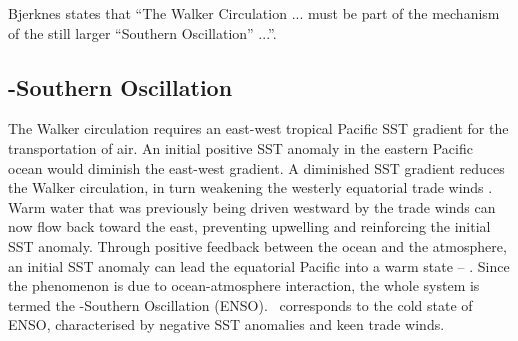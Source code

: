 Bjerknes states that ``The Walker Circulation ... must be part of the mechanism
of the still larger ``Southern Oscillation'' ...''.





\subsection{\elnino-Southern Oscillation}
The Walker circulation requires an east-west tropical Pacific SST gradient for
the transportation of air. An initial positive SST anomaly in the eastern
Pacific ocean would diminish the east-west gradient. A diminished SST gradient
reduces the Walker circulation, in turn weakening the westerly equatorial trade
winds \citep{lindzen1987}. Warm water that was previously being driven westward
by the trade winds can now flow back toward the east, preventing upwelling and
reinforcing the initial SST anomaly. Through positive feedback between the
ocean and the atmosphere, an initial SST anomaly can lead the equatorial Pacific
into a warm state -- \elnino. Since the phenomenon is due to ocean-atmosphere
interaction, the whole system is termed the \elnino-Southern Oscillation
(ENSO). {}\nina\ corresponds to the cold state of ENSO, characterised by
negative SST anomalies and keen trade winds.



